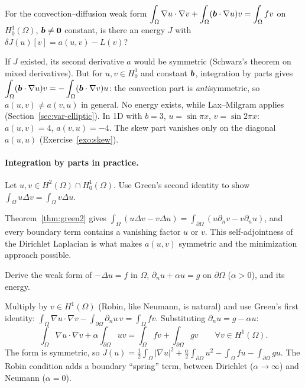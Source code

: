 \label{exo:no-energy}
%
For the convection--diffusion weak form
$\displaystyle \int_\Omega\nabla u\cdot\nabla v+\int_\Omega(\bm{b}\cdot\nabla u)v=\int_\Omega fv$
on $H^1_0(\Omega)$, $\bm{b}\neq\bm{0}$ constant, is there an energy $J$ with
$\delta J(u)[v]=a(u,v)-L(v)$?
\begin{solution}
If $J$ existed, its second derivative $a$ would be symmetric (Schwarz's
theorem on mixed derivatives). But for $u,v\in H^1_0$ and constant $\bm{b}$,
integration by parts gives
$\displaystyle \int_\Omega(\bm{b}\cdot\nabla u)v=-\int_\Omega(\bm{b}\cdot\nabla v)u$: the convection
part is \emph{anti}symmetric, so $a(u,v)\neq a(v,u)$ in general. No energy
exists, while Lax--Milgram applies (Section~\ref{sec:var-elliptic}). In 1D
with $b=3$, $u=\sin\pi x$, $v=\sin2\pi x$: $a(u,v)=4$, $a(v,u)=-4$. The skew
part vanishes only on the diagonal $a(u,u)$ (Exercise~\ref{exo:skew}).
\end{solution}

\paragraph{Integration by parts in practice.}

\label{exo:selfadj}
%
Let $u,v\in H^2(\Omega)\cap H^1_0(\Omega)$. Use Green's second identity to show
$\displaystyle \int_\Omega u\Delta v=\int_\Omega v\Delta u$.
\begin{solution}
Theorem~\ref{thm:green2} gives
$\displaystyle \int_\Omega(u\Delta v-v\Delta u)=\int_{\partial\Omega}(u\partial_nv-v\partial_nu)$,
and every boundary term contains a vanishing factor $u$ or $v$. This
self-adjointness of the Dirichlet Laplacian is what makes $a(u,v)$ symmetric
and the minimization approach possible.
\end{solution}

\label{exo:robin}
%
Derive the weak form of $-\Delta u=f$ in $\Omega$, $\partial_nu+\alpha u=g$ on
$\partial\Omega$ ($\alpha>0$), and its energy.
\begin{solution}
Multiply by $v\in H^1(\Omega)$ (Robin, like Neumann, is natural) and use
Green's first identity:
$\displaystyle \int_\Omega\nabla u\cdot\nabla v-\int_{\partial\Omega}\partial_nu\,v=\int_\Omega fv$.
Substituting $\partial_nu=g-\alpha u$:
\[
  \int_\Omega\nabla u\cdot\nabla v+\alpha\int_{\partial\Omega}uv
  =\int_\Omega fv+\int_{\partial\Omega}gv\qquad\forall v\in H^1(\Omega).
\]
The form is symmetric, so
$\displaystyle J(u)=\tfrac12\int_\Omega|\nabla u|^2+\tfrac\alpha2\int_{\partial\Omega}u^2-\int_\Omega fu-\int_{\partial\Omega}gu$.
The Robin condition adds a boundary ``spring'' term, between Dirichlet
($\alpha\to\infty$) and Neumann ($\alpha=0$).
\end{solution}

